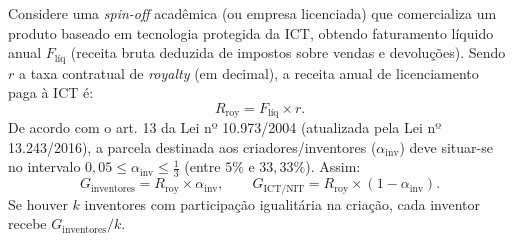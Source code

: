 \begin{boxFormula}
  Considere uma \textit{spin-off} acadêmica (ou empresa licenciada) que comercializa um produto baseado em tecnologia protegida da ICT, obtendo faturamento líquido anual $F_{\text{líq}}$ (receita bruta deduzida de impostos sobre vendas e devoluções). Sendo $r$ a taxa contratual de \textit{royalty} (em decimal), a receita anual de licenciamento paga à ICT é:
  \[
    R_{\text{roy}} = F_{\text{líq}} \times r.
  \]
  De acordo com o art. 13 da Lei nº 10.973/2004 (atualizada pela Lei nº 13.243/2016), a parcela destinada aos criadores/inventores ($\alpha_{\text{inv}}$) deve situar-se no intervalo $0{,}05 \le \alpha_{\text{inv}} \le \frac{1}{3}$ (entre $5\%$ e $33{,}33\%$). Assim:
  \[
    G_{\text{inventores}} = R_{\text{roy}} \times \alpha_{\text{inv}}, \qquad
    G_{\text{ICT/NIT}} = R_{\text{roy}} \times (1 - \alpha_{\text{inv}}).
  \]
  Se houver $k$ inventores com participação igualitária na criação, cada inventor recebe $G_{\text{inventores}} / k$.
\end{boxFormula}



